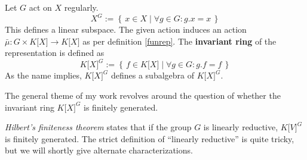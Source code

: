 \begin{definition}[Invariants]
  Let $ G $ act on $ X $ regularly.
  \begin{equation}
    X^G := \left\{\, x \in X \mid \forall g \in G : g . x = x \,\right\}
  \end{equation}
  This defines a linear subspace.
  The given action induces an action $ \bar{\mu} \colon G \times K\lbrack X\rbrack \longrightarrow K\lbrack X\rbrack $ as per definition \ref{funrep}.
  The \textbf{invariant ring} of the representation is defined as
  \begin{equation}
    K\lbrack X\rbrack^G := \left\{ \, f \in K\lbrack X \rbrack \mid \forall g \in G : g . f = f \, \right\}
  \end{equation}
  As the name implies, $ K\lbrack X\rbrack^G $ defines a subalgebra of $ K\lbrack X\rbrack^G $.
\end{definition}

The general theme of my work revolves around the question of whether the invariant ring $ K\lbrack X\rbrack^G $ is finitely generated.

\textit{Hilbert's finiteness theorem} states that if the group $G$ is linearly reductive, $ K\lbrack V\rbrack^G $ is finitely generated.
The strict definition of ``linearly reductive'' is quite tricky, but we will shortly give alternate characterizations.

